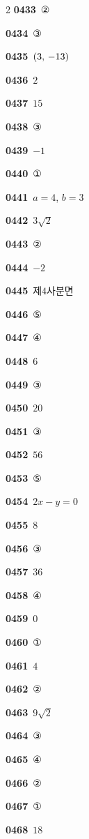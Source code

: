 \documentclass[10pt,a4paper]{article}
\begin{document}
\begin{multicols}{2}
\noindent\textbf{0433}\ ②\par
\noindent\textbf{0434}\ ③\par
\noindent\textbf{0435}\ $(3,\mkern3mu -13)$\par
\noindent\textbf{0436}\ $2$\par
\noindent\textbf{0437}\ $15$\par
\noindent\textbf{0438}\ ③\par
\noindent\textbf{0439}\ $-1$\par
\noindent\textbf{0440}\ ①\par
\noindent\textbf{0441}\ $a=4$, $b=3$\par
\noindent\textbf{0442}\ $3\sqrt{2}$\par
\noindent\textbf{0443}\ ②\par
\noindent\textbf{0444}\ $-2$\par
\noindent\textbf{0445}\ 제$4$사분면\par
\noindent\textbf{0446}\ ⑤\par
\noindent\textbf{0447}\ ④\par
\noindent\textbf{0448}\ $6$\par
\noindent\textbf{0449}\ ③\par
\noindent\textbf{0450}\ $20$\par
\noindent\textbf{0451}\ ③\par
\noindent\textbf{0452}\ $56$\par
\noindent\textbf{0453}\ ⑤\par
\noindent\textbf{0454}\ $2x-y=0$\par
\noindent\textbf{0455}\ $8$\par
\noindent\textbf{0456}\ ③\par
\noindent\textbf{0457}\ $36$\par
\noindent\textbf{0458}\ ④\par
\noindent\textbf{0459}\ $0$\par
\noindent\textbf{0460}\ ①\par
\noindent\textbf{0461}\ $4$\par
\noindent\textbf{0462}\ ②\par
\noindent\textbf{0463}\ $9\sqrt{2}$\par
\noindent\textbf{0464}\ ③\par
\noindent\textbf{0465}\ ④\par
\noindent\textbf{0466}\ ②\par
\noindent\textbf{0467}\ ①\par
\noindent\textbf{0468}\ $18$\par

\end{multicols}
\end{document}
